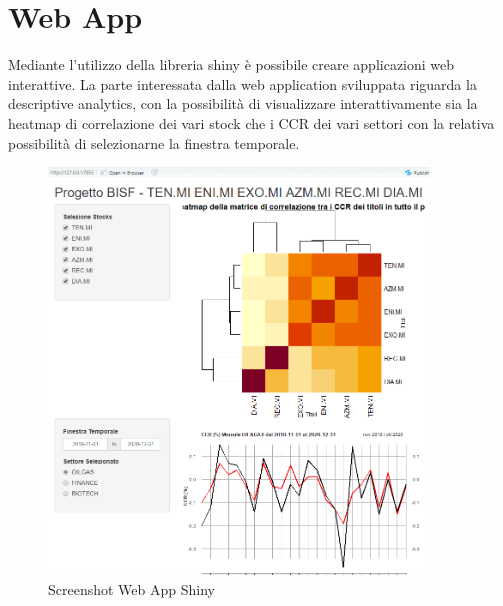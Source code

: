 \documentclass[12pt]{article}
\begin{document}
\section{Web App}
Mediante l'utilizzo della libreria shiny è possibile creare applicazioni web interattive. La parte interessata dalla web application sviluppata riguarda la descriptive analytics, con la possibilità di visualizzare interattivamente sia la heatmap di correlazione dei vari stock che i CCR dei vari settori con la relativa possibilità di selezionarne la finestra temporale.
\begin{figure}[!htb]
    \centering
    \includegraphics[width=0.9\textwidth]{immagini/WEBAPP.png}
    \caption{Screenshot Web App Shiny}
\end{figure}
\FloatBarrier
\end{document}
